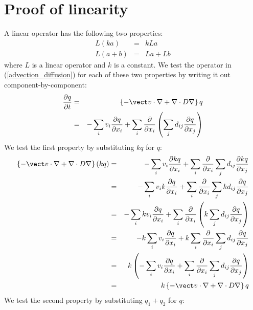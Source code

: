 
\section{Proof of linearity}

\label{linearity}

A linear operator has the following two properties:
\begin{eqnarray}
	L(ka) & = & kLa \\
	L(a+b) & = & La + Lb
\end{eqnarray}
where $L$ is a linear operator and $k$ is a constant.
We test the operator in (\ref{advection_diffusion}) for each of these two
properties by writing it out component-by-component:
\begin{eqnarray}
	\frac{\partial q}{\partial t} & = & \left \lbrace -\vect v \cdot \nabla + \nabla \cdot D \nabla \right \rbrace q \\
				   & = & - \sum_i v_i \frac{\partial q}{\partial x_i} + \sum_i \frac{\partial}{\partial x_i} \left ( \sum_j d_{ij} \frac{\partial q}{\partial x_j} \right )
\end{eqnarray}
We test the first property by substituting $kq$ for $q$:
\begin{eqnarray}
	\left \lbrace -\vect v \cdot \nabla + \nabla \cdot D \nabla \right \rbrace (kq) & = & - \sum_i v_i \frac{\partial kq}{\partial x_i} + \sum_i \frac{\partial}{\partial x_i} \sum_j d_{ij} \frac{\partial kq}{\partial x_j} \\
	& = & - \sum_i v_i k \frac{\partial q}{\partial x_i} + \sum_i \frac{\partial}{\partial x_i} \sum_j k d_{ij} \frac{\partial q}{\partial x_j} \\
	& = & - \sum_i k v_i \frac{\partial q}{\partial x_i} + \sum_i \frac{\partial}{\partial x_i} \left ( k \sum_j d_{ij} \frac{\partial q}{\partial x_j} \right ) \\
	& = & - k \sum_i v_i \frac{\partial q}{\partial x_i} + k \sum_i \frac{\partial}{\partial x_i} \sum_j d_{ij} \frac{\partial q}{\partial x_j} \\
	& = & k \left ( - \sum_i v_i \frac{\partial q}{\partial x_i} + \sum_i \frac{\partial}{\partial x_i} \sum_j d_{ij} \frac{\partial q}{\partial x_j} \right ) \\
	& = & k \left \lbrace -\vect v \cdot \nabla + \nabla \cdot D \nabla \right \rbrace q
\end{eqnarray}
We test the second property by substituting $q_1 + q_2$ for $q$:
